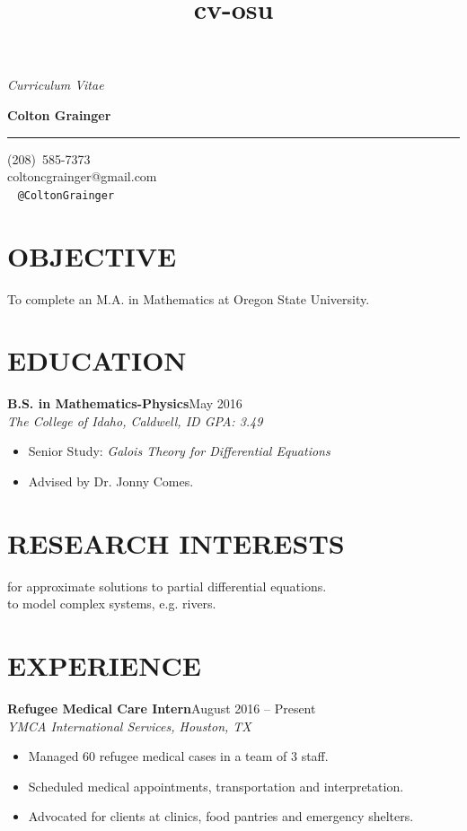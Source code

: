 \documentclass[margin]{res}
\title{cv-osu}
\newcommand\textbox[1]{\parbox{.333\textwidth}{#1} }
\newcommand\job[3]{\textbf{#1}\hfill {#2}\\ \emph{#3} }
\newcommand\degree[3]{\textbf{#1}\hfill {#2}\\ \emph{#3} }
\newenvironment{details}{\begin{itemize}[itemsep=0.6pt,topsep=2.2pt] }{\end{itemize} }
\begin{document}
 

\noindent\textbox{{\it Curriculum Vitae }\hfill } \textbox{\hfill{\large\bf Colton Grainger}\hfill }

\vspace{-20pt}
\rule{\textwidth}{1pt}

\vspace{-20pt}
\begin{flushright} 
(208)~585-7373\\ coltoncgrainger@gmail.com\\ \faTwitter\ \faGithub\hspace{1ex} {\tt @ColtonGrainger} 
\end{flushright}
\vspace{-24pt}

\begin{resume}

\section{OBJECTIVE}
To complete an M.A. in Mathematics at Oregon State University.

\section{EDUCATION}
\degree{B.S. in Mathematics-Physics}{May 2016}{The College of Idaho, Caldwell, ID \hfill {\rm GPA: 3.49}}
    \begin{details}
   		\item Senior Study: \emph{Galois Theory for Differential Equations}
        \item Advised by Dr. Jonny Comes.
    \end{details}

\section{RESEARCH INTERESTS}
 for approximate solutions to partial differential equations.\\
 to model complex systems, e.g. rivers.

\section{EXPERIENCE}
\job{Refugee Medical Care Intern}{August 2016 -- Present}{YMCA International Services, Houston, TX}
    \begin{details}
	  	\item Managed 60 refugee medical cases in a team of 3 staff.
        \item Scheduled medical appointments, transportation and interpretation.
        \item Advocated for clients at clinics, food pantries and emergency shelters. 
	\end{details}
     

\end{resume}
\end{document}
